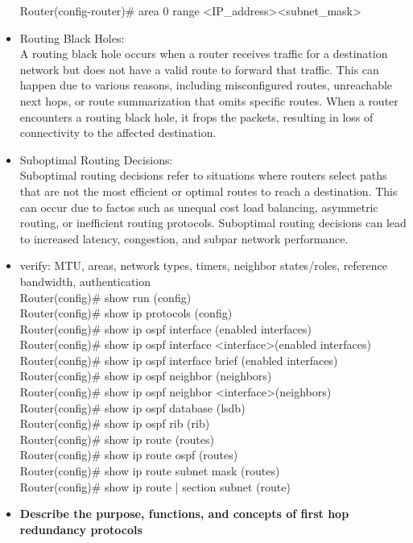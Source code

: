 \documentclass{article}
\begin{document}
\begin{itemize}
  		Router(config-router)\# area 0 range \textless IP\_address\textgreater \textless subnet\_mask\textgreater
  	\item[] Routing Black Holes:\\
  		A routing black hole occurs when a router receives traffic for a destination network but does not have a valid route to forward that traffic. This can happen due to various reasons, including misconfigured routes, unreachable next hops, or route summarization that omits specific routes. When a router encounters a routing black hole, it frops the packets, resulting in loss of connectivity to the affected destination.
  	\item[] Suboptimal Routing Decisions:\\
  		Suboptimal routing decisions refer to situations where routers select paths that are not the most efficient or optimal routes to reach a destination. This can occur due to factos such as unequal cost load balancing, asymmetric routing, or inefficient routing protocols. Suboptimal routing decisions can lead to increased latency, congestion, and subpar network performance.
  		
  	\item[] verify: MTU, areas, network types, timers, neighbor states/roles, reference bandwidth, authentication\\
  		Router(config)\# show run (config)\\
  		Router(config)\# show ip protocols (config)\\
  		
  		Router(config)\# show ip ospf interface (enabled interfaces)\\
  		Router(config)\# show ip ospf interface \textless interface\textgreater (enabled interfaces)\\
  		Router(config)\# show ip ospf interface brief (enabled interfaces)\\
  		
  		Router(config)\# show ip ospf neighbor (neighbors)\\
  		Router(config)\# show ip ospf neighbor \textless interface\textgreater (neighbors)\\
  		
  		Router(config)\# show ip ospf database (lsdb)\\
  		
  		Router(config)\# show ip ospf rib (rib)\\
  		
  		Router(config)\# show ip route (routes)\\
  		Router(config)\# show ip route ospf (routes)\\
  		Router(config)\# show ip route subnet mask (routes)\\
  		Router(config)\# show ip route | section subnet (route)
  \item \textbf{Describe the purpose, functions, and concepts of first hop redundancy protocols}\\
\end{itemize}
\end{document}
